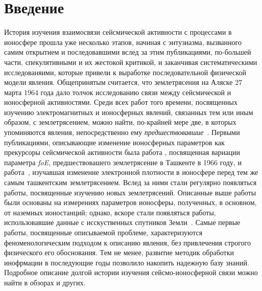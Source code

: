 \documentclass[12pt, oneside, a4paper]{article}
\begin{document}
\section{Введение}
История изучения взаимосвязи сейсмической активности с процессами в ионосфере прошла уже несколько этапов, начиная с энтузиазма, вызванного самим открытием и последовавшими вслед за этим публикациями, по-большей части, спекулятивными и их жестокой критикой, и заканчивая систематическими исследованяими, которые привели к выработке  последовательной физической модели явления. Общепринятым считается, что землетрясения на Аляске 27 марта 1964 года дало толчок исследованию связи между сейсмической и ионосферной активностями. Среди всех работ того времени, посвященных изучению электромагнитных и ионосферных явлений, связанных тем или иным образом, с землетрясением, можно найти, по-крайней мере две, в которых упоминяются явления, непосредственно ему \emph{предшествовавшие}~\cite{Moore:1964,Davies_Baker:1965}. Первыми публикациями, описывающие изменение ионосферных параметров как прекурсоры сейсмической активности была работа \cite{Antselevich:1971}, посвященная вариации параметра \emph{foE}, предшествовашего землетрясение в Ташкенте в 1966 году, и работа~\cite{Datchenko:1972}, изучавшая изменение электронной плотности в ионосфере перед тем же самым ташкентским землетрясением. Вслед за ними стали регулярно появляться работы, посвященные изучению новых землетрясений. Описанные выше работы были основаны на измерениях параметров ионосферы, полученных, в основном, от наземных ионостанций; однако, вскоре стали появляться работы, использовавшие данные с исскуственных спутников Земли~\cite{Gokhberg:1983}. Самые первые работы, посвященные описываемой проблеме, характеризуются феноменологическим подходом к описанию явления, без привлечения строгого физического его обоснования. Тем не менее, развитие методик обработки инофрмации в последующие годы позволило накопить надежную базу знаний. Подробное описание долгой истории изучения сейсмо-ионосферной связи  можно найти в обзорах \cite{Liperovsky:1990,Gaivoronskaya:1991} и других.
\end{document}
